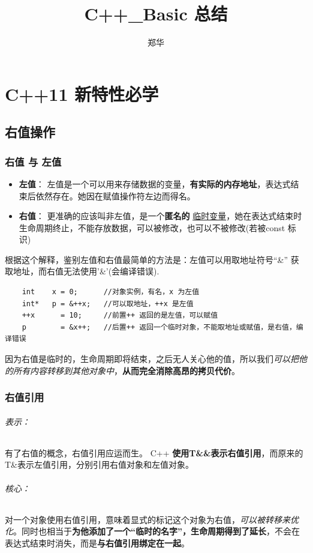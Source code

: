 \documentclass[UTF8,a4paper,12pt]{ctexbook} %
\author{\kaishu 郑华}
\title{\textbf{C++\_Basic 总结}}
\begin{document}
 
	
	\maketitle
	\tableofcontents 
		
\chapter{C++11 新特性必学}
	\section{右值操作}
		\subsection{右值 与 左值}
		\begin{itemize}
			\item \textbf{左值}： 左值是一个可以用来存储数据的变量，\textbf{有实际的内存地址}，表达式结束后依然存在。她因在赋值操作符左边而得名。
			
			\item \textbf{右值}： 更准确的应该叫非左值，是一个\textbf{匿名的} \underline{临时变量}，她在表达式结束时生命周期终止，不能存放数据，可以被修改，也可以不被修改(若被const 标识)
		\end{itemize}	
		
		根据这个解释，鉴别左值和右值最简单的方法是：左值可以用取地址符号“\&” 获取地址，而右值无法使用'\&'(会编译错误).
		\begin{lstlisting}
	int    x = 0;      //对象实例，有名，x 为左值
	int*   p = &++x;   //可以取地址，++x 是左值
	++x      = 10;	   //前置++ 返回的是左值，可以赋值
	p        = &x++;   //后置++ 返回一个临时对象，不能取地址或赋值，是右值，编译错误
		\end{lstlisting}
		
		因为右值是临时的，生命周期即将结束，之后无人关心他的值，所以我们\textit{可以把他的所有内容转移到其他对象中}，\textbf{从而完全消除高昂的拷贝代价}。
		
		\subsection{右值引用}
			\subparagraph{表示：}
			有了右值的概念，右值引用应运而生。 C++ \textbf{使用T\&\&表示右值引用}，而原来的T\&表示左值引用，分别引用右值对象和左值对象。
			
			\subparagraph{核心：}
			对一个对象使用右值引用，意味着显式的标记这个对象为右值，\textit{可以被转移来优化}。同时也相当于\textbf{为他添加了一个“临时的名字”，生命周期得到了延长}，不会在表达式结束时消失，而是\textbf{与右值引用绑定在一起}。
			
\end{document}

